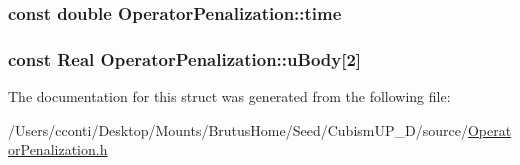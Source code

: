 \subsubsection[{time}]{\setlength{\rightskip}{0pt plus 5cm}const double Operator\+Penalization\+::time}\label{struct_operator_penalization_ae71ef9456d8ef4f2b054da734444581c}
\hypertarget{struct_operator_penalization_a4a7db22b3ff2eba63d29c4484b6fbd0d}{}
\subsubsection[{u\+Body}]{\setlength{\rightskip}{0pt plus 5cm}const {\bf Real} Operator\+Penalization\+::u\+Body\mbox{[}2\mbox{]}}\label{struct_operator_penalization_a4a7db22b3ff2eba63d29c4484b6fbd0d}


The documentation for this struct was generated from the following file\+:\begin{DoxyCompactItemize}
\item 
/\+Users/cconti/\+Desktop/\+Mounts/\+Brutus\+Home/\+Seed/\+Cubism\+U\+P\+\_\+D/source/\hyperlink{_operator_penalization_8h}{Operator\+Penalization.\+h}\end{DoxyCompactItemize}
